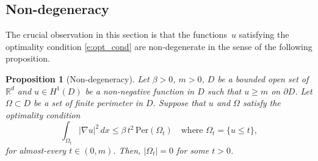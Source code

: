 \documentclass[11pt]{article}
\numberwithin{equation}{section}
\newcommand{\Per}{\mathrm{Per}}
\theoremstyle{plain}
\newtheorem{prop}[teo]{Proposition}
\theoremstyle{definition}
\def\R{\mathbb{R}}
\begin{document}
\subsection{Non-degeneracy} The crucial observation in this section is that the functions~$u$ satisfying the optimality condition \eqref{e:opt_cond} are non-degenerate in the sense of the following proposition.
\begin{prop}[Non-degeneracy]\label{p:non-degeneracy}
Let $\beta>0$, $m>0$, $D$ be a bounded open set of $\R^d$ and $u\in H^1(D)$ be a non-negative function in $D$ such that $u\ge m$ on $\partial D$. Let $\Omega\subset D$ be a set of finite perimeter in $D$. Suppose that $u$ and $\Omega$ satisfy the optimality condition
\begin{equation}\label{e:opt_cond_nd}
\int_{\Omega_t}|\nabla u|^2\,dx\le \beta\, t^2\, \Per(\Omega_t)\quad\text{where }\Omega_t=\{u\le t\},
\end{equation}
for almost-every $t\in(0,m)$. Then, $|\Omega_t|=0$ for some $t>0$.
\end{prop}
\end{document}
